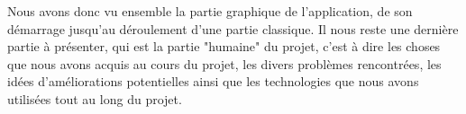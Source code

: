 	Nous avons donc vu ensemble la partie graphique de l'application, de son démarrage jusqu'au déroulement d'une partie classique. Il nous reste une dernière partie à présenter, qui est la partie "humaine" du projet, c'est à dire les choses que nous avons acquis au cours du projet, les divers problèmes rencontrées, les idées d'améliorations potentielles ainsi que les technologies que nous avons utilisées tout au long du projet.
